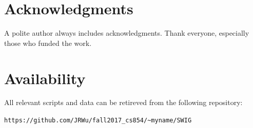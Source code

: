 \documentclass[letterpaper,twocolumn,10pt]{article}
\begin{document}
\section{Acknowledgments}

A polite author always includes acknowledgments.  Thank everyone,
especially those who funded the work. 

\section{Availability}\label{Availability}
All relevant scripts and data can be retireved from the following repository:
\begin{center}
{\tt https://github.com/JRWu/fall2017\_cs854/\~{}myname/SWIG}
\end{center}


{\footnotesize 
}


\theendnotes
\end{document}
